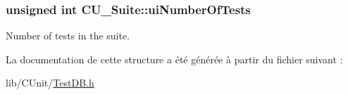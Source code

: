 \hypertarget{structCU__Suite_ac35747775ea5ffbb4cc1a2eb17dd1ca3}{
\subsubsection[{ui\-Number\-Of\-Tests}]{\setlength{\rightskip}{0pt plus 5cm}unsigned int C\-U\-\_\-\-Suite\-::ui\-Number\-Of\-Tests}}\label{structCU__Suite_ac35747775ea5ffbb4cc1a2eb17dd1ca3}


Number of tests in the suite. 



La documentation de cette structure a été générée à partir du fichier suivant \-:\begin{DoxyCompactItemize}
\item 
lib/\-C\-Unit/\hyperlink{TestDB_8h}{Test\-D\-B.\-h}\end{DoxyCompactItemize}
